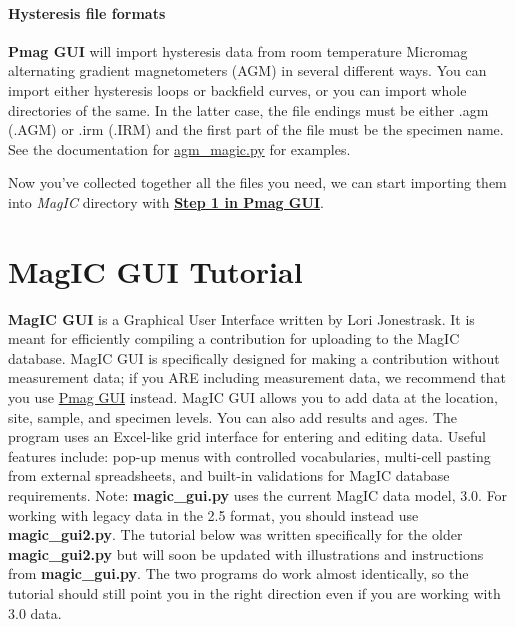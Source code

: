 \documentclass[11pt]{book}
\begin{document}
{

\subsubsection{Hysteresis file formats}
{\bf Pmag GUI} will import hysteresis data from room temperature  Micromag alternating gradient magnetometers (AGM)  in several different ways.  You can import either hysteresis loops or backfield curves, or you can import whole directories of the same.  In the latter case, the file endings must be either .agm (.AGM) or .irm (.IRM) and the first part of the file must be the specimen name.
 See the documentation for  \href{#agm\_magic.py}{agm\_magic.py} for examples.


Now you've collected together all the files you need, we can start importing them into {\it MagIC} directory with   \href{#convert2magic}{\bf Step 1 in Pmag GUI}.




\chapter{MagIC GUI Tutorial}
\label{chap:MagIC GUI}

{\bf MagIC GUI} is a Graphical User Interface written by Lori Jonestrask.  It is meant for efficiently compiling a contribution for uploading to the MagIC database.  MagIC GUI is specifically designed for making a contribution without measurement data; if you ARE including measurement data, we recommend that you use \href{#pmag_gui.py}{Pmag GUI} instead.
MagIC GUI allows you to add data at the location, site, sample, and specimen levels.  You can also add results and ages.  The program uses an Excel-like grid interface for entering and editing data.  Useful features include: pop-up menus with controlled vocabularies, multi-cell pasting from external spreadsheets, and built-in validations for MagIC database requirements.
Note: {\bf magic\_gui.py} uses the current MagIC data model, 3.0.  For working with legacy data in the 2.5 format, you should instead use {\bf magic\_gui2.py}.  The tutorial below was written specifically for the older  {\bf magic\_gui2.py} but will soon be updated with illustrations and instructions from {\bf magic\_gui.py}. The two programs do work almost identically, so the tutorial should still point you in the right direction even if you are working with 3.0 data.


}
\end{document}
